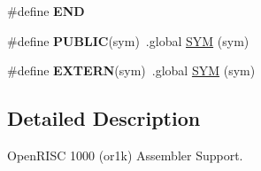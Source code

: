 \begin{DoxyCompactItemize}
\mbox{\label{group__RTEMSScoreCPUor1kASM_ga29fd18bed01c4d836c7ebfe73a125c3f}} 
\#define {\bfseries E\+ND}
\item 
\mbox{\label{group__RTEMSScoreCPUor1kASM_ga5e536c0e80cb78da6a74541281111e40}} 
\#define {\bfseries P\+U\+B\+L\+IC}(sym)~.global \mbox{\hyperlink{group__RTEMSScoreCPUx86-64ASM_gafe05d428a5f345f51fb591debb815325}{S\+YM}} (sym)
\item 
\mbox{\label{group__RTEMSScoreCPUor1kASM_ga9808b867f8d1bd54d78548a5cd5dc415}} 
\#define {\bfseries E\+X\+T\+E\+RN}(sym)~.global \mbox{\hyperlink{group__RTEMSScoreCPUx86-64ASM_gafe05d428a5f345f51fb591debb815325}{S\+YM}} (sym)
\end{DoxyCompactItemize}


\subsection{Detailed Description}
Open\+R\+I\+SC 1000 (or1k) Assembler Support. 

